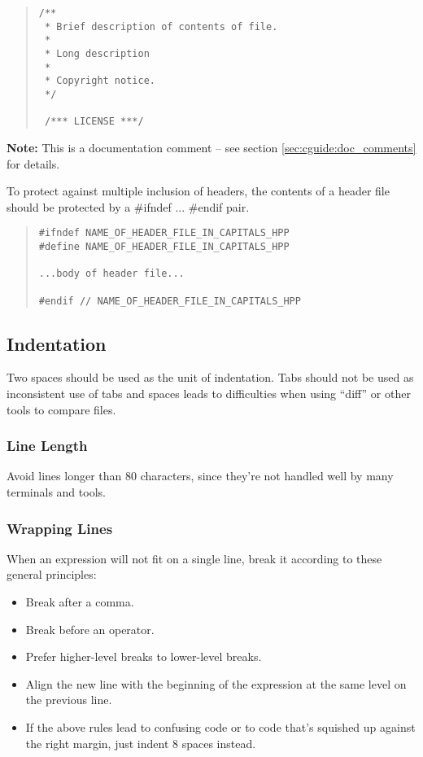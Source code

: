 \documentclass{article}
\begin{document}
\begin{quote}
\begin{verbatim}
/** 
 * Brief description of contents of file.
 * 
 * Long description
 * 
 * Copyright notice.
 */

 /*** LICENSE ***/

\end{verbatim}
\end{quote}

\textbf{Note:}
This is a documentation comment -- see section
\ref{sec:cguide:doc_comments} for details.

To protect against multiple inclusion of headers, the contents of a
header file should be protected by a \#ifndef ... \#endif pair.

\begin{quote}
\begin{verbatim}
#ifndef NAME_OF_HEADER_FILE_IN_CAPITALS_HPP
#define NAME_OF_HEADER_FILE_IN_CAPITALS_HPP

...body of header file...

#endif // NAME_OF_HEADER_FILE_IN_CAPITALS_HPP

\end{verbatim}
\end{quote}


\subsection{Indentation}

Two spaces should be used as the unit of indentation.  Tabs should not
be used as inconsistent use of tabs and spaces leads to difficulties
when using ``diff'' or other tools to compare files.

\subsubsection{Line Length}

Avoid lines longer than 80 characters, since they're not handled well
by many terminals and tools.
 

\subsubsection{Wrapping Lines}

When an expression will not fit on a single line, break it according
to these general principles:

\begin{itemize}
\item Break after a comma.  
\item Break before an operator.  
\item Prefer higher-level breaks to lower-level breaks.  
\item Align the new line with the beginning of the expression at the same
      level on the previous line.
\item If the above rules lead to confusing code or to code that's squished
      up against the right margin, just indent 8 spaces instead.
\end{itemize}
\end{document}
